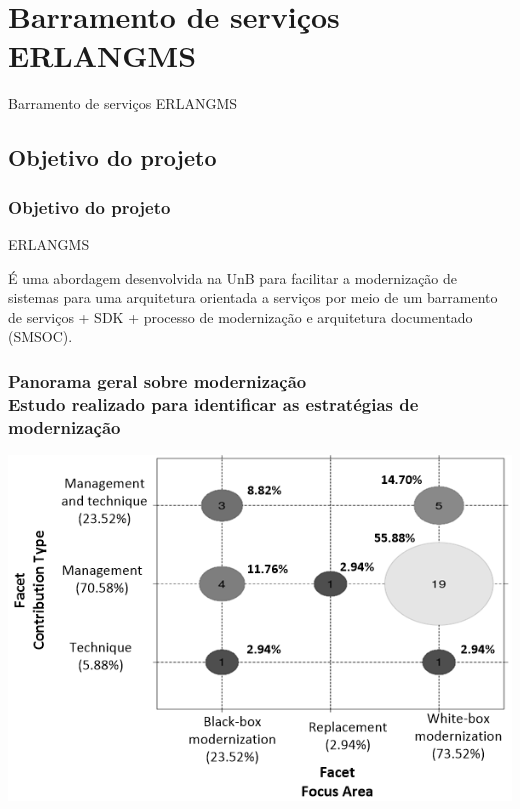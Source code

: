 \documentclass{beamer}
\begin{document}
\section{Barramento de serviços ERLANGMS}


\begin{frame}[c]{ }
\centering
\huge{Barramento de serviços ERLANGMS}
\end{frame}


\subsection{Objetivo do projeto}


\begin{frame}
\frametitle{Objetivo do projeto}

\begin{exampleblock}{ERLANGMS}
	
	É uma abordagem desenvolvida na UnB para facilitar a modernização de sistemas para uma arquitetura orientada a serviços 
	por meio de um barramento de serviços + SDK + processo 
	de modernização e arquitetura documentado (SMSOC).
	
\end{exampleblock}


\end{frame}



\begin{frame}
\frametitle{Panorama geral sobre modernização  \\ \small{Estudo realizado para identificar as estratégias de modernização}}


	\centering
	\includegraphics[scale=0.45]{img/bubble_diagram.png}

\end{frame}
\end{document}
